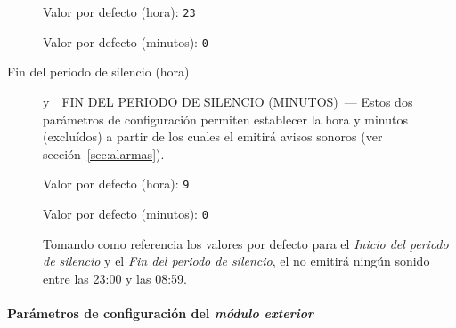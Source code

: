 \begin{description}
  Valor por defecto (hora): \texttt{23}
  
  Valor por defecto (minutos): \texttt{0}
  
  \item[Fin del periodo de silencio (hora)] y~~{\color{main}\uppercase{Fin del periodo de silencio (minutos)}}~--- Estos dos parámetros de configuración permiten establecer la hora y minutos (excluídos) a partir de los cuales el \CMS emitirá avisos sonoros (ver sección~\ref{sec:alarmas}).
  
  Valor por defecto (hora): \texttt{9}
  
  Valor por defecto (minutos): \texttt{0}
  
  Tomando como referencia los valores por defecto para el \emph{Inicio del periodo de silencio} y el \emph{Fin del periodo de silencio}, el \CMS no emitirá ningún sonido entre las 23:00 y las 08:59.
  \attend
\end{description}

\paragraph{Parámetros de configuración del \textit{módulo exterior}}
\label{sec:params-exterior}

